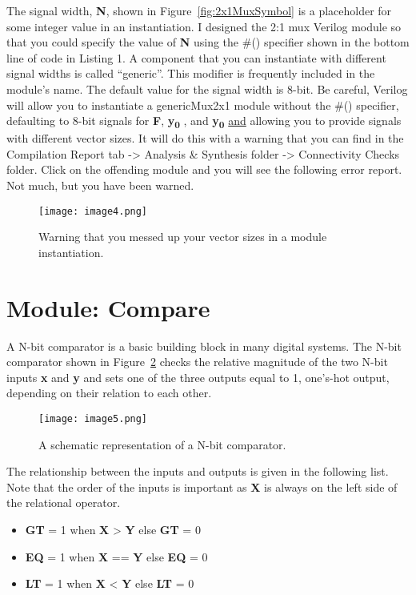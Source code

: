 The signal width, \textbf{N}, shown in Figure~\ref{fig:2x1MuxSymbol} is a placeholder for
some integer value in an instantiation. I designed the 2:1 mux Verilog
module so that you could specify the value of \textbf{N} using the \#()
specifier shown in the bottom line of code in Listing 1. A component
that you can instantiate with different signal widths is called
``generic''. This modifier is frequently included in the module's name.
The default value for the signal width is 8-bit. Be careful, Verilog
will allow you to instantiate a genericMux2x1 module without the \#()
specifier, defaulting to 8-bit signals for \textbf{F},
\textbf{y\textsubscript{0}} , and \textbf{y\textsubscript{0}}
\uline{and} allowing you to provide signals with different vector sizes.
It will do this with a warning that you can find in the Compilation
Report tab -\textgreater{} Analysis \& Synthesis folder -\textgreater{}
Connectivity Checks folder. Click on the offending module and you will
see the following error report. Not much, but you have been warned.

\begin{figure}[ht]
\texttt{[image: image4.png]}
\caption{Warning that you messed up your vector sizes in a module instantiation.}
\label{fig:vectorSizeWarnings}
\end{figure}

\hypertarget{compare-module}{%
\section{Module: Compare}\label{compare-module}}

A N-bit comparator is a basic building block in many digital systems.
The N-bit comparator shown in Figure~\ref{fig:comparatorSymbol} 
checks the relative magnitude of
the two N-bit inputs \textbf{x} and \textbf{y} and sets one of the three
outputs equal to 1, one's-hot output, depending on their relation to
each other.

\begin{figure}[ht]
\texttt{[image: image5.png]}
\caption{A schematic representation of a N-bit comparator.}
\label{fig:comparatorSymbol}
\end{figure}

The relationship between the inputs and outputs is given in the
following list. Note that the order of the inputs is important as
\textbf{X} is always on the left side of the relational operator.

\begin{itemize}
\item    \textbf{GT} = 1 when \textbf{X} \textgreater{} \textbf{Y} else  \textbf{GT} = 0
\item    \textbf{EQ} = 1 when \textbf{X} == \textbf{Y} else \textbf{EQ} = 0
\item    \textbf{LT} = 1 when \textbf{X} \textless{} \textbf{Y} else   \textbf{LT} = 0
\end{itemize}

